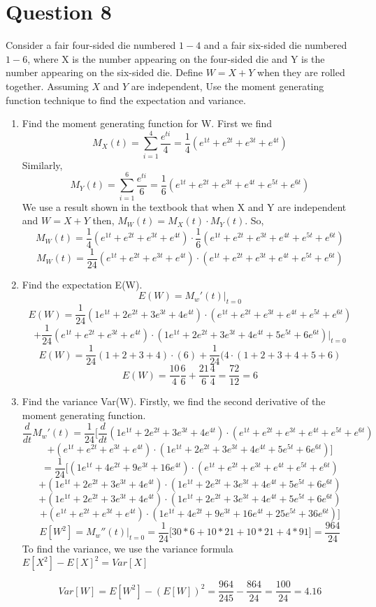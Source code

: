\documentclass[svgnames]{article}
\begin{document}
\section{Question 8}
Consider a fair four-sided die numbered $1 - 4$ and a fair six-sided die numbered $1 - 6$, where X is
the number appearing on the four-sided die and Y is the number appearing on the six-sided die.
Define $W=X+Y$ when they are rolled together. Assuming $X$ and $Y$ are independent,
Use the moment generating function technique to find the expectation and variance.
\begin{enumerate}[label = (\alph*)]
\item
Find the moment generating function for W.
First we find 
$$M_{X}(t)=\sum^{4}_{i=1}\frac{e^{ti}}{4}=\frac{1}{4}(e^{1t}+e^{2t}+e^{3t}+e^{4t})$$
Similarly,
$$M_{Y}(t)=\sum^{6}_{i=1}\frac{e^{ti}}{6}=\frac{1}{6}(e^{1t}+e^{2t}+e^{3t}+e^{4t}+e^{5t}+e^{6t})$$
We use a result shown in the textbook that when X and Y are independent and $W =X+Y$ then, $M_{W}(t)= M_{X}(t) \cdot M_{Y}(t)$.
\newline
So,
$$M_{W}(t)=\frac{1}{4}(e^{1t}+e^{2t}+e^{3t}+e^{4t})\cdot \frac{1}{6}(e^{1t}+e^{2t}+e^{3t}+e^{4t}+e^{5t}+e^{6t})$$
$$M_{W}(t)=\frac{1}{24}(e^{1t}+e^{2t}+e^{3t}+e^{4t})\cdot (e^{1t}+e^{2t}+e^{3t}+e^{4t}+e^{5t}+e^{6t})$$
\item 
Find the expectation E(W).
$$E(W)=M_{w}'(t)\Big|_{t=0}$$
$$E(W)=\frac{1}{24}(1e^{1t}+2e^{2t}+3e^{3t}+4e^{4t})\cdot (e^{1t}+e^{2t}+e^{3t}+e^{4t}+e^{5t}+e^{6t})$$
$$+ \frac{1}{24}(e^{1t}+e^{2t}+e^{3t}+e^{4t})\cdot (1e^{1t}+2e^{2t}+3e^{3t}+4e^{4t}+5e^{5t}+6e^{6t})\Big|_{t=0}$$
$$E(W) =\frac{1}{24}(1+2+3+4)\cdot (6) + \frac{1}{24}(4\cdot (1+2+3+4+5+6)$$
$$E(W)=\frac{10}{4}\frac{6}{6}+\frac{21}{6}\frac{4}{4}=\frac{72}{12}=6$$
\item 
Find the variance Var(W). 
\newline
\newline
Firstly, we find the second derivative of the moment generating function.
$$\frac{d}{dt}M_{w}'(t)=\frac{1}{24}\Big[\frac{d}{dt}(1e^{1t}+2e^{2t}+3e^{3t}+4e^{4t})\cdot (e^{1t}+e^{2t}+e^{3t}+e^{4t}+e^{5t}+e^{6t})$$
$$+ (e^{1t}+e^{2t}+e^{3t}+e^{4t})\cdot (1e^{1t}+2e^{2t}+3e^{3t}+4e^{4t}+5e^{5t}+6e^{6t}) \Big]$$
$$=\frac{1}{24}\Big[(1e^{1t}+4e^{2t}+9e^{3t}+16e^{4t})\cdot (e^{1t}+e^{2t}+e^{3t}+e^{4t}+e^{5t}+e^{6t}) $$
$$+(1e^{1t}+2e^{2t}+3e^{3t}+4e^{4t})\cdot  (1e^{1t}+2e^{2t}+3e^{3t}+4e^{4t}+5e^{5t}+6e^{6t}) $$
$$+ (1e^{1t}+2e^{2t}+3e^{3t}+4e^{4t})\cdot (1e^{1t}+2e^{2t}+3e^{3t}+4e^{4t}+5e^{5t}+6e^{6t}) $$
$$+(e^{1t}+e^{2t}+e^{3t}+e^{4t})\cdot (1e^{1t}+4e^{2t}+9e^{3t}+16e^{4t}+25e^{5t}+36e^{6t})\Big] $$
$$E[W^2]=M_{w}''(t)\Big|_{t=0}=\frac{1}{24}\Big[30*6 +10*21 + 10*21 + 4 * 91\Big]=\frac{964}{24}$$
\newline
\newline
To find the variance, we use the variance formula $E[X^2]-E[X]^2 = Var[X]$

$$Var[W]=E[W^2] - (E[W])^2 = \frac{964}{245} - \frac{864}{24}= \frac{100}{24}=4.16$$

\end{enumerate}
\end{document}

